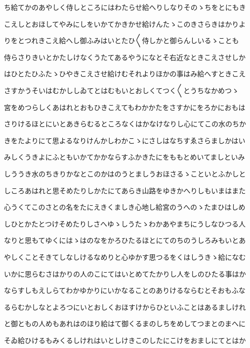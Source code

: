 \documentclass[a4paper,11pt,landscape]{ltjtarticle}
\begin{document}
\par\medskip
ち給てかのあやしく侍しところにはわたらせ給へりしなりそのゝちをとにもき
\par\medskip
こえしとおほしてやみにしをいかてかきかせ給けんたゝこのきさらきはかりよ
\par\medskip
りをとつれきこえ給へし御ふみはいとたひ〱侍しかと御らんしいるゝことも
\par\medskip
侍らさりきいとかたしけなくうたてあるやうになとそ右近なときこえさせしか
\par\medskip
はひとたひふたゝひやきこえさせ給けむそれよりほかの事はみ給へすときこえ
\par\medskip
さすかうそいはむかししゐてとはむもいとおしくてつく〱とうちなかめつゝ
\par\medskip
宮をめつらしくあはれとおもひきこえてもわかかたをさすかにをろかにおもは
\par\medskip
さりけるほとにいとあきらむるところなくはかなけなりし心にてこの水のちか
\par\medskip
きをたよりにて思よるなりけんかしわかこゝにさしはなちすゑさらましかはい
\par\medskip
みしくうきよにふともいかてかかならすふかきたにをももとめいてましといみ
\par\medskip
しううき水のちきりかなとこのかはのうとましうおほさるゝこといとふかしと
\par\medskip
しころあはれと思そめたりしかたにてあらき山路をゆきかへりしもいまはまた
\par\medskip
心うくてこのさとの名をたにえきくましき心地し給宮のうへのゝたまひはしめ
\par\medskip
しひとかたとつけそめたりしさへゆゝしうたゝわかあやまちにうしなひつる人
\par\medskip
なりと思もてゆくにはゝはのなをかろひたるほとにてのちのうしろみもいとあ
\par\medskip
やしくことそきてしなしけるなめりと心ゆかす思つるをくはしうきゝ給になむ
\par\medskip
いかに思らむさはかりの人のこにてはいとめてたかりし人をしのひたる事はか
\par\medskip
ならすしもえしらてわかゆかりにいかなることのありけるならむとそおもふな
\par\medskip
るらむかしなとよろつにいとおしくおほすけからひといふことはあるましけれ
\par\medskip
と御ともの人めもあれはのほり給はて御くるまのしちをめしてつまとのまへに
\par\medskip
そゐ給ひけるもみくるしけれはいとしけきこのしたにこけをおましにてとはか
\end{document}
